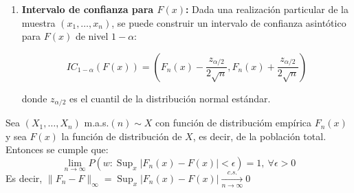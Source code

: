 \begin{proposición}
\begin{enumerate}
\begin{enumerate}
	      \end{enumerate}

	\item \textbf{Intervalo de confianza para \( F(x) \):}
	      Dada una realización particular de la muestra \( (x_1, \dots, x_n) \), se puede construir un intervalo de confianza asintótico para \( F(x) \) de nivel \( 1 - \alpha \):

	      $$ IC_{1-\alpha}(F(x)) = \left( F_n(x) - \frac{z_{\alpha/2}}{2\sqrt{n}}, F_n(x) + \frac{z_{\alpha/2}}{2\sqrt{n}} \right) $$

	      donde \( z_{\alpha/2} \) es el cuantil de la distribución normal estándar.

\end{enumerate}
\end{proposición}

\begin{teorema}
	Sea $\left(X_{1}, \ldots, X_{n}\right)$ m.a.s.$(n) \sim X$ con función de distribucióm empírica $F_{n}(x)$ y sea $F(x)$ la función de distribución de $X$, es decir, de la población total. Entonces se cumple que:
	\[\lim _{n \rightarrow \infty} P\left(w: \operatorname{Sup}_{x}\left|F_{n}(x)-F(x)\right|<\epsilon\right)=1, \ \forall \epsilon>0\]
	Es decir, $\lVert F_{n}-F \rVert_{\infty} = \operatorname{Sup}_{x}\left|F_{n}(x)-F(x)\right| \xrightarrow[n \rightarrow \infty]{c.s.} 0$
\end{teorema}

